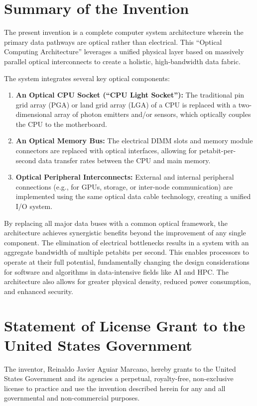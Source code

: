 \documentclass[11pt,letterpaper]{article}
\begin{document}
\section*{Summary of the Invention}
The present invention is a complete computer system architecture wherein the primary data pathways are optical rather than electrical. This ``Optical Computing Architecture'' leverages a unified physical layer based on massively parallel optical interconnects to create a holistic, high-bandwidth data fabric.

The system integrates several key optical components:
\begin{enumerate}
    \item \textbf{An Optical CPU Socket (``CPU Light Socket''):} The traditional pin grid array (PGA) or land grid array (LGA) of a CPU is replaced with a two-dimensional array of photon emitters and/or sensors, which optically couples the CPU to the motherboard.
    \item \textbf{An Optical Memory Bus:} The electrical DIMM slots and memory module connectors are replaced with optical interfaces, allowing for petabit-per-second data transfer rates between the CPU and main memory.
    \item \textbf{Optical Peripheral Interconnects:} External and internal peripheral connections (e.g., for GPUs, storage, or inter-node communication) are implemented using the same optical data cable technology, creating a unified I/O system.
\end{enumerate}

By replacing all major data buses with a common optical framework, the architecture achieves synergistic benefits beyond the improvement of any single component. The elimination of electrical bottlenecks results in a system with an aggregate bandwidth of multiple petabits per second. This enables processors to operate at their full potential, fundamentally changing the design considerations for software and algorithms in data-intensive fields like AI and HPC. The architecture also allows for greater physical density, reduced power consumption, and enhanced security.

\section*{Statement of License Grant to the United States Government}
The inventor, Reinaldo Javier Aguiar Marcano, hereby grants to the United States Government and its agencies a perpetual, royalty-free, non-exclusive license to practice and use the invention described herein for any and all governmental and non-commercial purposes.
\end{document}
